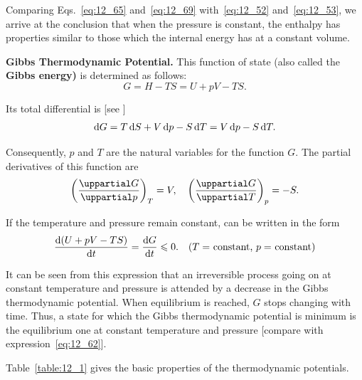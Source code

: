 \noindent
Comparing Eqs.~\eqref{eq:12_65} and~\eqref{eq:12_69} with~\eqref{eq:12_52} and~\eqref{eq:12_53}, we arrive at the conclusion that when the pressure is constant, the enthalpy has properties similar to those which the internal energy has at a constant volume.

\textbf{Gibbs Thermodynamic Potential.} This function of state (also called the \textbf{Gibbs energy)} is determined as follows:
\begin{equation}\label{eq:12_70}
	G = H - TS = U + pV - TS.
\end{equation}

\noindent
Its total differential is [see ]
\begin{equation}\label{eq:12_71}
	\mathrm{d} G = T\,\mathrm{d} S + V\,\mathrm{d} p - S\,\mathrm{d} T = V\,\mathrm{d} p - S\,\mathrm{d} T.
\end{equation}

\noindent
Consequently, $p$ and $T$ are the natural variables for the function $G$. The partial derivatives of this function are
\begin{equation}\label{eq:12_72}
	\parenthesis{\diffpartial{G}{p}}_T = V,\quad 	\parenthesis{\diffpartial{G}{T}}_p = -S.
\end{equation}

If the temperature and pressure remain constant,  can be written in the form
\begin{equation}\label{eq:12_73}
	\frac{\mathrm{d}(U+pV-TS)}{\mathrm{d} t} = \frac{\mathrm{d} G}{\mathrm{d} t} \leqslant 0.\quad \text{($T = $ constant, $p = $ constant)}
\end{equation}

\noindent
It can be seen from this expression that an irreversible process going on at constant temperature and pressure is attended by a decrease in the Gibbs thermodynamic potential. When equilibrium is reached, $G$ stops changing with time. Thus, a state for which the Gibbs thermodynamic potential is minimum is the equilibrium one at constant temperature and pressure [compare with expression~\eqref{eq:12_62}].

Table~\ref{table:12_1} gives the basic properties of the thermodynamic potentials.

